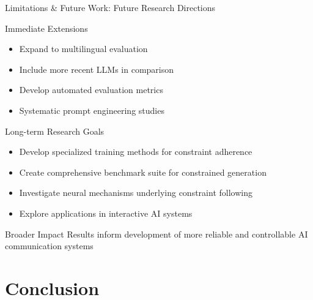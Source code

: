 \documentclass[aspectratio=169]{beamer}
\begin{document}
\begin{frame}{Limitations \& Future Work: Future Research Directions}
\begin{block}{Immediate Extensions}
\begin{itemize}
    \item Expand to multilingual evaluation
    \item Include more recent LLMs in comparison
    \item Develop automated evaluation metrics
    \item Systematic prompt engineering studies
\end{itemize}
\end{block}

\begin{block}{Long-term Research Goals}
\begin{itemize}
    \item Develop specialized training methods for constraint adherence
    \item Create comprehensive benchmark suite for constrained generation
    \item Investigate neural mechanisms underlying constraint following
    \item Explore applications in interactive AI systems
\end{itemize}
\end{block}

\begin{exampleblock}{Broader Impact}
Results inform development of more reliable and controllable AI communication systems
\end{exampleblock}
\end{frame}

\section{Conclusion}
\end{document}
